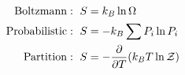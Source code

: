 

\vspace*{\fill}
\centering

\begin{align*}
    {\rm Boltzmann}:~S &= k_{B}\ln{\Omega} \\
    {\rm Probabilistic}:~S &= -k_{B}\sum P_{i}\ln{P_{i}} \\
    {\rm Partition}:~S &= -\pdv{T}(k_{B}T\ln{\mathcal{Z}})
\end{align*}

\centering
\vspace*{\fill}

